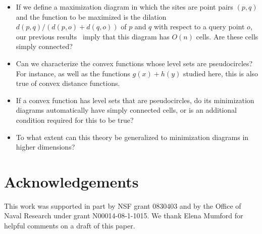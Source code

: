 \documentclass[10pt, conference, compsocconf]{IEEEtran}
\begin{document}
\begin{itemize}
\item If we define a maximization diagram in which the sites are point pairs $(p,q)$ and the function to be maximized is the dilation $d(p,q)/(d(p,o)+d(q,o))$ of $p$ and $q$ with respect to a query point $o$, our previous results~\cite{EppWor-CGTA-07} imply that this diagram has $O(n)$ cells. Are these cells simply connected?
\item Can we characterize the convex functions whose level sets are pseudocircles? For instance, as well as the functions $g(x)+h(y)$ studied here, this is also true of convex distance functions.
\item If a convex function has level sets that are pseudocircles, do its minimization diagrams automatically have simply connected cells, or is an additional condition required for this to be true?
\item To what extent can this theory be generalized to minimization diagrams in higher dimensions?
\end{itemize}

\section*{Acknowledgements}

This work was supported in part by NSF grant
0830403 and by the Office of Naval Research under grant
N00014-08-1-1015. We thank Elena Mumford for helpful comments on a draft of this paper.



\end{document}
